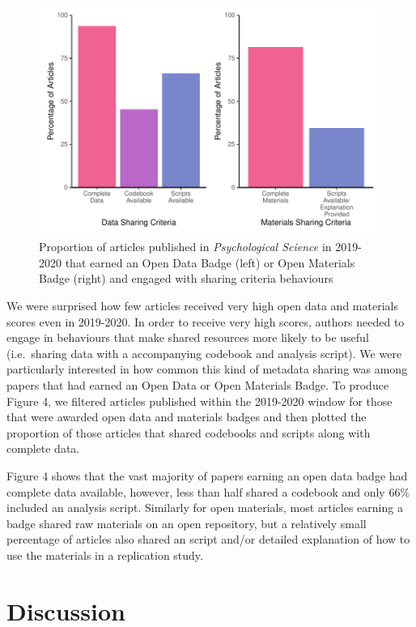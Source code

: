 \documentclass[
  english,
  man,floatsintext]{apa6}
\begin{document}
\begin{figure}
\centering
\includegraphics{icd_special_issue_revision_files/figure-latex/unnamed-chunk-4-1.pdf}
\caption{\label{fig:unnamed-chunk-4}Proportion of articles published in \emph{Psychological Science} in 2019-2020 that earned an Open Data Badge (left) or Open Materials Badge (right) and engaged with sharing criteria behaviours}
\end{figure}

We were surprised how few articles received very high open data and materials scores even in 2019-2020. In order to receive very high scores, authors needed to engage in behaviours that make shared resources more likely to be useful (i.e.~sharing data with a accompanying codebook and analysis script). We were particularly interested in how common this kind of metadata sharing was among papers that had earned an Open Data or Open Materials Badge. To produce Figure 4, we filtered articles published within the 2019-2020 window for those that were awarded open data and materials badges and then plotted the proportion of those articles that shared codebooks and scripts along with complete data.

Figure 4 shows that the vast majority of papers earning an open data badge had complete data available, however, less than half shared a codebook and only 66\% included an analysis script. Similarly for open materials, most articles earning a badge shared raw materials on an open repository, but a relatively small percentage of articles also shared an script and/or detailed explanation of how to use the materials in a replication study.

\hypertarget{discussion}{%
\section{Discussion}\label{discussion}}
\end{document}
